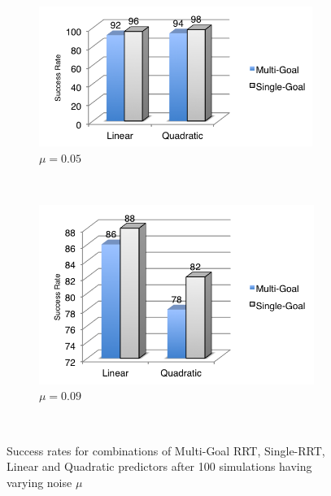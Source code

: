 \documentclass[letterpaper, 10 pt, conference]{ieeeconf}  %
\begin{document}
\begin{figure}
        \centering
        \begin{subfigure}[b]{0.25\textwidth}
                \centering
                \includegraphics[width=\textwidth]{fig/noise-005}
                \caption{$\mu = 0.05$}
                \label{fig:noise-005}
        \end{subfigure}%
        ~ %
        \begin{subfigure}[b]{0.2\textwidth}
                \centering
                \includegraphics[width=\textwidth]{fig/noise-009}
                \caption{$\mu = 0.09$}
                \label{fig:noise-009}
        \end{subfigure}
        ~ %
        \caption{Success rates for combinations of Multi-Goal RRT, Single-RRT, Linear and Quadratic predictors after 100 simulations having varying noise $\mu$}\label{fig:noise}
\end{figure}
\end{document}
